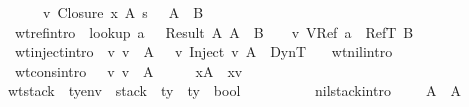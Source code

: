 \begin{isabellebody}
\ \ \ \ \ {\isasymSigma}\ {\isasymturnstile}v\ {\isacharparenleft}Closure\ x\ A\ s\ {\isasymrho}{\isacharparenright}\ {\isacharcolon}\ A\ {\isasymrightarrow}\ B{\isachardoublequoteclose}\ {\isacharbar}\isanewline
\ \ wt{\isacharunderscore}ref{\isacharbrackleft}intro{\isacharbang}{\isacharbrackright}{\isacharcolon}\ {\isachardoublequoteopen}{\isasymlbrakk}\ lookup\ a\ {\isasymSigma}\ {\isacharequal}\ Result\ A{\isacharsemicolon}\ A\ {\isasymsqsubseteq}\ B\ {\isasymrbrakk}\ {\isasymLongrightarrow}\ {\isasymSigma}\ {\isasymturnstile}v\ {\isacharparenleft}VRef\ a{\isacharparenright}\ {\isacharcolon}\ RefT\ B{\isachardoublequoteclose}\ {\isacharbar}\isanewline
\ \ wt{\isacharunderscore}inject{\isacharbrackleft}intro{\isacharbang}{\isacharbrackright}{\isacharcolon}\ {\isachardoublequoteopen}{\isasymSigma}\ {\isasymturnstile}v\ v\ {\isacharcolon}\ A\ {\isasymLongrightarrow}\ {\isasymSigma}\ {\isasymturnstile}v\ {\isacharparenleft}Inject\ v\ A{\isacharparenright}\ {\isacharcolon}\ DynT{\isachardoublequoteclose}\ {\isacharbar}\isanewline
\isanewline
\ \ wt{\isacharunderscore}nil{\isacharbrackleft}intro{\isacharbang}{\isacharbrackright}{\isacharcolon}\ {\isachardoublequoteopen}{\isacharbrackleft}{\isacharbrackright}{\isacharsemicolon}{\isasymSigma}\ {\isasymturnstile}\ {\isacharbrackleft}{\isacharbrackright}{\isachardoublequoteclose}\ {\isacharbar}\isanewline
\ \ wt{\isacharunderscore}cons{\isacharbrackleft}intro{\isacharbang}{\isacharbrackright}{\isacharcolon}\ {\isachardoublequoteopen}{\isasymlbrakk}\ {\isasymSigma}\ {\isasymturnstile}v\ v\ {\isacharcolon}\ A{\isacharsemicolon}\ {\isasymGamma}{\isacharsemicolon}{\isasymSigma}\ {\isasymturnstile}\ {\isasymrho}\ {\isasymrbrakk}\ {\isasymLongrightarrow}\ {\isacharparenleft}x{\isacharcomma}A{\isacharparenright}{\isacharhash}{\isasymGamma}{\isacharsemicolon}{\isasymSigma}\ {\isasymturnstile}\ {\isacharparenleft}x{\isacharcomma}v{\isacharparenright}{\isacharhash}{\isasymrho}{\isachardoublequoteclose}\isanewline
\isanewline
{}\isamarkupfalse \ wt{\isacharunderscore}stack\ {\isacharcolon}{\isacharcolon}\ {\isachardoublequoteopen}ty{\isacharunderscore}env\ {\isasymRightarrow}\ stack\ {\isasymRightarrow}\ ty\ {\isasymRightarrow}\ ty\ {\isasymRightarrow}\ bool{\isachardoublequoteclose}\ {\isacharparenleft}{\isachardoublequoteopen}{\isacharunderscore}\ {\isasymturnstile}\ {\isacharunderscore}\ {\isacharcolon}\ {\isacharunderscore}\ {\isasymRightarrow}\ {\isacharunderscore}{\isachardoublequoteclose}{\isacharparenright}\ \isanewline
\ \ nil{\isacharunderscore}stack{\isacharbrackleft}intro{\isacharbang}{\isacharbrackright}{\isacharcolon}\ {\isachardoublequoteopen}{\isasymSigma}\ {\isasymturnstile}\ {\isacharbrackleft}{\isacharbrackright}\ {\isacharcolon}\ A\ {\isasymRightarrow}\ A{\isachardoublequoteclose}\ {\isacharbar}\isanewline

\end{isabellebody}
